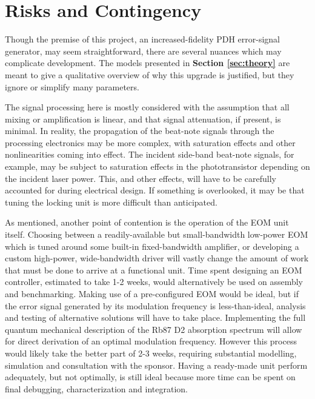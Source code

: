 \newpage
\section{Risks and Contingency}

Though the premise of this project, an increased-fidelity PDH error-signal
generator, may seem straightforward, there are several nuances which may
complicate development. The models presented in \textbf{Section
\ref{sec:theory}} are meant to give a qualitative overview of why this upgrade
is justified, but they ignore or simplify many parameters.

The signal processing here is mostly considered with the assumption that all
mixing or amplification is linear, and that signal attenuation, if present,
is minimal. In reality, the propagation of the beat-note signals through the
processing electronics may be more complex, with saturation effects and other
nonlinearities coming into effect. The incident side-band beat-note signals,
for example, may be subject to saturation effects in the phototransistor
depending on the incident laser power. This, and other effects, will have to be
carefully accounted for during electrical design. If something is overlooked,
it may be that tuning the locking unit is more difficult than anticipated.

As mentioned, another point of contention is the operation of the EOM unit
itself. Choosing between a readily-available but small-bandwidth low-power EOM
which is tuned around some built-in fixed-bandwidth amplifier, or developing
a custom high-power, wide-bandwidth driver will vastly change the amount of
work that must be done to arrive at a functional unit. Time spent designing an
EOM controller, estimated to take 1-2 weeks, would alternatively be used on
assembly and benchmarking. Making use of a pre-configured EOM would be ideal, but
if the error signal generated by its modulation frequency is less-than-ideal,
analysis and testing of alternative solutions will have to take place.
Implementing the full quantum mechanical description of the Rb87 D2 absorption
spectrum will allow for direct derivation of an optimal modulation frequency.
However this process would likely take the better part of 2-3 weeks, requiring
substantial modelling, simulation and consultation with the sponsor. Having a
ready-made unit perform adequately, but not optimally, is still ideal because
more time can be spent on final debugging, characterization and integration.

